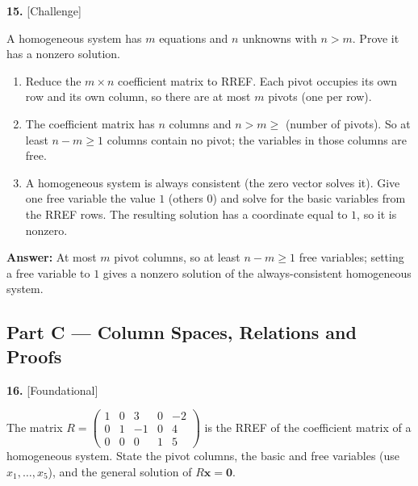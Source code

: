 \documentclass[11pt]{article}
\begin{document}
\par\vspace{2pt}
\begin{minipage}{\linewidth}\textbf{15.} \hfill{\scriptsize\color{ink}[Challenge]}\par\nopagebreak A homogeneous system has $m$ equations and $n$ unknowns with $n>m$. Prove it has a nonzero solution.
\end{minipage}\par\nopagebreak
\begin{tcolorbox}[breakable,colback=ans,colframe=ansb,boxrule=0.5pt,left=4pt,right=4pt,top=2pt,bottom=2pt]\begin{enumerate}[leftmargin=2.2em,itemsep=1pt,topsep=1pt,label=\textbf{Step \arabic*.}]\item Reduce the $m\times n$ coefficient matrix to RREF. Each pivot occupies its own row and its own column, so there are at most $m$ pivots (one per row).
\item The coefficient matrix has $n$ columns and $n>m\ge$ (number of pivots). So at least $n-m\ge1$ columns contain no pivot; the variables in those columns are free.
\item A homogeneous system is always consistent (the zero vector solves it). Give one free variable the value $1$ (others $0$) and solve for the basic variables from the RREF rows. The resulting solution has a coordinate equal to $1$, so it is nonzero.
\end{enumerate}\textbf{Answer:} At most $m$ pivot columns, so at least $n-m\ge1$ free variables; setting a free variable to $1$ gives a nonzero solution of the always-consistent homogeneous system.\end{tcolorbox}
\par\vspace{2pt}
\subsection*{\normalsize\color{ink} Part C --- Column Spaces, Relations and Proofs}
\begin{minipage}{\linewidth}\textbf{16.} \hfill{\scriptsize\color{ink}[Foundational]}\par\nopagebreak The matrix $R=\begin{pmatrix}1 & 0 & 3 & 0 & -2 \\ 0 & 1 & -1 & 0 & 4 \\ 0 & 0 & 0 & 1 & 5\end{pmatrix}$ is the RREF of the coefficient matrix of a homogeneous system. State the pivot columns, the basic and free variables (use $x_1,\dots,x_5$), and the general solution of $R\mathbf x=\mathbf 0$.
\end{minipage}\par\nopagebreak
\end{document}
